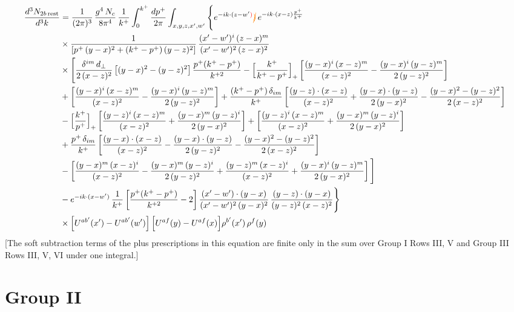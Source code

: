 \documentclass[9pt]{article}
\numberwithin{equation}{section}
\begin{document}
\begin{align}
\frac{d^{3}N_{2b\,\rm rest}}{d^{3}k} & =\frac{1}{(2\pi)^{3}}\,\frac{g^{4}\,N_{c}}{8\pi^{4}}\,\frac{1}{k^{+}}\int_{0}^{k^{+}}\frac{dp^{+}}{2\pi}\int_{x,y,z,x',w'}\Bigg\{e^{-ik\cdot(z-w'{\color{red})}}{\color{orange}\cancel{)}}\,e^{-ik\cdot(x-z)\frac{p^{+}}{k^{+}}}\notag \\ & \times\frac{1}{\left[p^{+}\,(y-x)^{2}+(k^{+}-p^{+})\,(y-z)^{2}\right]}\,\frac{(x'-w')^{i}\,(z-x)^{m}}{(x'-w')^{2}\,(z-x)^{2}}\notag\\
&\times\Bigg[\frac{\delta^{im}\,d_{\perp}}{2\,(x-z)^{2}}\left[(y-x)^{2}-(y-z)^{2}\right]\frac{p^{+}(k^{+}-p^{+})}{k^{+2}}
-\Big[\frac{k^{+}}{k^{+}-p^{+}}\Big]_{+}\left[\frac{(y-x)^{i}\,(x-z)^{m}}{(x-z)^{2}}-\frac{(y-x)^{i}\,(y-z)^{m}}{2\,(y-z)^{2}}\right]\notag\\
&+\left[\frac{(y-x)^{i}\,(x-z)^{m}}{(x-z)^{2}}-\frac{(y-x)^{i}\,(y-z)^{m}}{2\,(y-z)^{2}}\right]
+\frac{(k^{+}-p^{+})\,\delta_{im}}{k^{+}}\left[\frac{(y-z)\cdot(x-z)}{(x-z)^{2}}+\frac{(y-x)\cdot(y-z)}{2\,(y-x)^{2}}-\frac{(y-x)^{2}-(y-z)^{2}}{2\,(x-z)^{2}}\right]\notag\\
&-\Big[\frac{k^{+}}{p^{+}}\Big]_{+}\left[\frac{(y-z)^{i}\,(x-z)^{m}}{(x-z)^{2}}+\frac{(y-x)^{m}\,(y-z)^{i}}{2\,(y-x)^{2}}\right]+\left[\frac{(y-z)^{i}\,(x-z)^{m}}{(x-z)^{2}}+\frac{(y-x)^{m}\,(y-z)^{i}}{2\,(y-x)^{2}}\right]\notag\\
&+\frac{p^{+}\,\delta_{im}}{k^{+}}\left[\frac{(y-x)\cdot(x-z)}{(x-z)^{2}}-\frac{(y-x)\cdot(y-z)}{2\,(y-z)^{2}}-\frac{(y-x)^{2}-(y-z)^{2}}{2\,(x-z)^{2}}\right]\notag\\
&-\left[\frac{(y-x)^{m}\,(x-z)^{i}}{(x-z)^{2}}-\frac{(y-x)^{m}\,(y-z)^{i}}{2\,(y-z)^{2}}+\frac{(y-z)^{m}\,(x-z)^{i}}{(x-z)^{2}}+\frac{(y-x)^{i}\,(y-z)^{m}}{2\,(y-x)^{2}}\right]\Bigg]\notag\\
&-e^{-ik\cdot(x-w')}\,\frac{1}{k^{+}}\left[\frac{p^{+}(k^{+}-p^{+})}{k^{+2}}-2\right]\frac{(x'-w')\cdot(y-x)}{(x'-w')^{2}\,(y-x)^{2}}\,\frac{(y-z)\cdot(y-x)}{(y-z)^{2}\,(x-z)^{2}}\Bigg\}\notag\\
&\times\Big[U^{ab'}(x')-U^{ab'}(w')\Big]\,\Big[U^{af}(y)-U^{af}(x)\Big]\rho^{b'}(x')\,\rho^{f}(y)
\end{align} {\color{red}[The soft subtraction terms of the plus prescriptions in this equation are finite only in the sum over Group I Rows III, V and Group III Rows III, V, VI under one integral.]}\par\noindent
\section{Group II}
\end{document}
